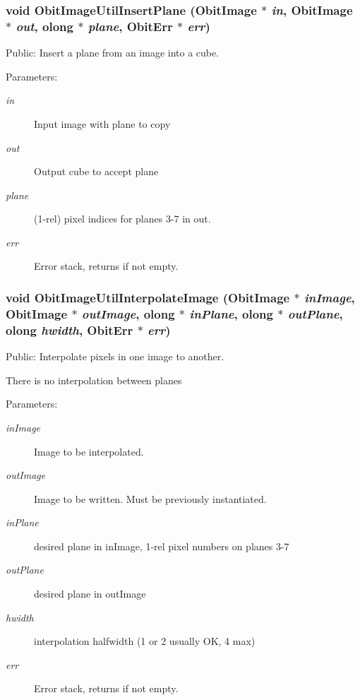 \subsubsection{\setlength{\rightskip}{0pt plus 5cm}void Obit\-Image\-Util\-Insert\-Plane ({\bf Obit\-Image} $\ast$ {\em in}, {\bf Obit\-Image} $\ast$ {\em out}, {\bf olong} $\ast$ {\em plane}, {\bf Obit\-Err} $\ast$ {\em err})}\label{ObitImageUtil_8h_a16}


Public: Insert a plane from an image into a cube. 

\begin{Desc}
\item[Parameters:]
\begin{description}
\item[{\em in}]Input image with plane to copy \item[{\em out}]Output cube to accept plane \item[{\em plane}](1-rel) pixel indices for planes 3-7 in out. \item[{\em err}]Error stack, returns if not empty. \end{description}
\end{Desc}
\subsubsection{\setlength{\rightskip}{0pt plus 5cm}void Obit\-Image\-Util\-Interpolate\-Image ({\bf Obit\-Image} $\ast$ {\em in\-Image}, {\bf Obit\-Image} $\ast$ {\em out\-Image}, {\bf olong} $\ast$ {\em in\-Plane}, {\bf olong} $\ast$ {\em out\-Plane}, {\bf olong} {\em hwidth}, {\bf Obit\-Err} $\ast$ {\em err})}\label{ObitImageUtil_8h_a6}


Public: Interpolate pixels in one image to another. 

There is no interpolation between planes \begin{Desc}
\item[Parameters:]
\begin{description}
\item[{\em in\-Image}]Image to be interpolated. \item[{\em out\-Image}]Image to be written. Must be previously instantiated. \item[{\em in\-Plane}]desired plane in in\-Image, 1-rel pixel numbers on planes 3-7 \item[{\em out\-Plane}]desired plane in out\-Image \item[{\em hwidth}]interpolation halfwidth (1 or 2 usually OK, 4 max) \item[{\em err}]Error stack, returns if not empty. \end{description}
\end{Desc}
